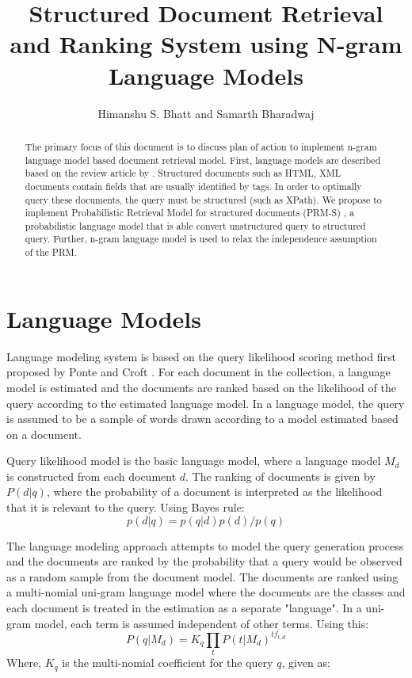 \documentclass[draftcls, onecolumn, 11pt]{IEEEtran}
\title{{Structured Document Retrieval and Ranking System using N-gram Language Models}}
\author{{Himanshu S. Bhatt and Samarth Bharadwaj}}
\begin{document}
\maketitle

\begin{abstract}
The primary focus of this document is to discuss plan of action to implement n-gram language model based document retrieval model. First, language models are described based on the review article by \cite{Zhai}. Structured documents such as HTML, XML documents contain fields that are usually identified by tags. In order to optimally query these documents, the query must be structured (such as XPath). We propose to implement Probabilistic Retrieval Model for structured documents (PRM-S) \cite{Kim}, a probabilistic language model that is able convert unstructured query to structured query. Further, n-gram language model is used to relax the independence assumption of the PRM.
\end{abstract}

\section{Language Models}
Language modeling system is based on the query likelihood scoring method first proposed by Ponte and Croft \cite{Ponte}. For each document in the collection, a language model is estimated and the documents are ranked based on the likelihood of the query according to the estimated language model. In a language model, the query is assumed to be a sample of words drawn according to a model estimated based on a document.

Query likelihood model is the basic language model, where a language model $M_d$ is constructed from each document $d$. The ranking of documents is given by $P(d|q)$, where the probability of a document is interpreted as the likelihood that it is relevant to the query. Using Bayes rule:
\begin{equation}
p(d|q)=p(q|d) p(d)/p(q)
\end{equation}

\vspace{16pt}

The language modeling approach attempts to model the query generation process and the documents are ranked by the probability that a query would be observed as a random sample from the document model. The documents are ranked using a multi-nomial uni-gram language model where the documents are the classes and each document is treated in the estimation as a separate "language". In a uni-gram model, each term is assumed independent of other terms. Using this:
\begin{equation}
P(q|M_d)=K_q \prod_{t}P(t|M_d)^{tf_{t,d}}
\end{equation}
\noindent Where, $K_q$ is the multi-nomial coefficient for the query $q$, given as:
\end{document}
